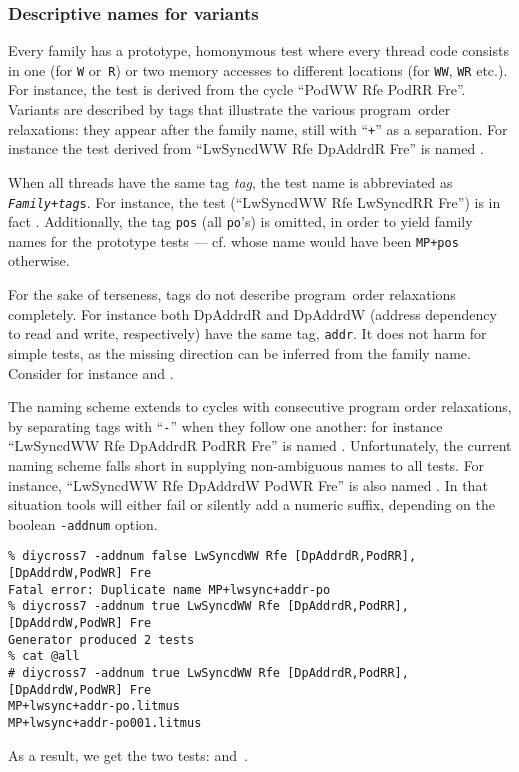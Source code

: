 \subsubsection{Descriptive names for variants}
Every family has a prototype, homonymous test where every thread code
consists in one (for \texttt{W} or~\texttt{R}) or two memory accesses
to different locations (for \texttt{WW}, \texttt{WR} etc.).
For instance, the  test
is derived from the cycle ``PodWW Rfe PodRR Fre''.
Variants are described by tags that illustrate the various
program~order relaxations: they appear after the family name, still with ``\texttt{+}'' as a separation.
For instance the test derived from ``LwSyncdWW Rfe DpAddrdR Fre''
is named .

When all threads have the same tag \emph{tag}, the test name is abbreviated
as \texttt{\emph{Family}+\emph{tag}s}. For instance,
the test  (``LwSyncdWW Rfe LwSyncdRR Fre'') is in fact
.
Additionally, the tag \texttt{pos} (all \texttt{po}'s) is omitted,
in order to yield family names for the prototype tests --- cf.
  whose name would have been
\texttt{MP+pos} otherwise.

For the sake of terseness, tags do not describe program~order relaxations
completely. For instance both DpAddrdR and DpAddrdW (address dependency to
read and write, respectively) have the same tag, \texttt{addr}.
It does not harm for simple tests, as the missing direction can be inferred from
the family name. Consider for instance
 and
.
\begin{center}
\qquad{}
\end{center}

The naming scheme extends to cycles with consecutive program order relaxations,
by separating tags with ``\texttt{-}'' when they follow one another:
for instance ``LwSyncdWW Rfe DpAddrdR PodRR Fre'' is named
. Unfortunately, the current naming scheme falls short
in supplying non-ambiguous names to all tests.
For instance,
``LwSyncdWW Rfe DpAddrdW PodWR Fre'' is also named .
In that situation tools will either fail or silently add a numeric suffix,
depending on the boolean \texttt{-addnum} option.
\begin{verbatim}
% diycross7 -addnum false LwSyncdWW Rfe [DpAddrdR,PodRR],[DpAddrdW,PodWR] Fre
Fatal error: Duplicate name MP+lwsync+addr-po
% diycross7 -addnum true LwSyncdWW Rfe [DpAddrdR,PodRR],[DpAddrdW,PodWR] Fre
Generator produced 2 tests
% cat @all
# diycross7 -addnum true LwSyncdWW Rfe [DpAddrdR,PodRR],[DpAddrdW,PodWR] Fre
MP+lwsync+addr-po.litmus
MP+lwsync+addr-po001.litmus
\end{verbatim}
As a result, we get the two tests:
 and~.
\begin{center}
\qquad{}
\end{center}

